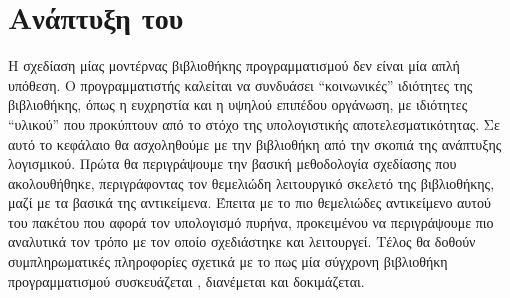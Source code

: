 \chapter{Ανάπτυξη του }
\label{chap3}
Η σχεδίαση μίας μοντέρνας βιβλιοθήκης προγραμματισμού δεν είναι μία απλή υπόθεση.
Ο προγραμματιστής καλείται να συνδυάσει ``κοινωνικές'' ιδιότητες της βιβλιοθήκης, όπως η ευχρηστία και η υψηλού επιπέδου οργάνωση, με ιδιότητες ``υλικού'' που προκύπτουν από το στόχο της υπολογιστικής αποτελεσματικότητας.
Σε αυτό το κεφάλαιο θα ασχοληθούμε με την βιβλιοθήκη από την σκοπιά της ανάπτυξης λογισμικού.
Πρώτα θα περιγράψουμε την βασική μεθοδολογία σχεδίασης που ακολουθήθηκε, περιγράφοντας τον θεμελιώδη λειτουργικό σκελετό της βιβλιοθήκης, μαζί με τα βασικά της αντικείμενα.
Έπειτα με το πιο θεμελιώδες αντικείμενο αυτού του πακέτου που αφορά τον υπολογισμό πυρήνα, προκειμένου να περιγράψουμε πιο αναλυτικά τον τρόπο με τον οποίο σχεδιάστηκε και λειτουργεί.
Τέλος θα δοθούν συμπληρωματικές πληροφορίες σχετικά με το πως μία σύγχρονη βιβλιοθήκη προγραμματισμού συσκευάζεται , διανέμεται και δοκιμάζεται.
